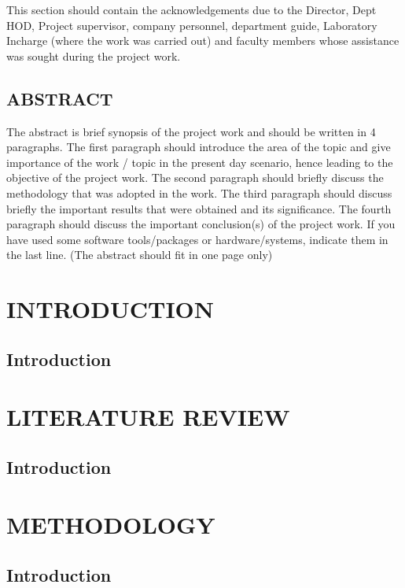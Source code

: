 \documentclass[a4paper,12pt]{report}
\begin{document}
This section should contain the acknowledgements due to the Director, Dept HOD, Project supervisor, company personnel, department guide, Laboratory Incharge (where the work was carried out) and faculty members whose assistance was sought during the project work.
\clearpage
\newpage
\begin{center} \section*{\textbf{\Large ABSTRACT}} \end{center}
The abstract is brief synopsis of the project work and should be written in 4 paragraphs. The
first paragraph should introduce the area of the topic and give importance of the work / topic
in the present day scenario, hence leading to the objective of the project work. The second
paragraph should briefly discuss the methodology that was adopted in the work. The third
paragraph should discuss briefly the important results that were obtained and its significance.
The fourth paragraph should discuss the important conclusion(s) of the project work. If you
have used some software tools/packages or hardware/systems, indicate them in the last line.
(The abstract should fit in one page only)
\newpage
\tableofcontents
\thispagestyle{empty}
\newpage
\listoffigures
{}
\thispagestyle{empty}
\newpage
\listoftables
{}
\thispagestyle{empty}
\newpage
{}
\chapter{\textbf{\Large INTRODUCTION}}
\section{\textbf{ Introduction }}
\newpage
\chapter{\textbf{\Large LITERATURE REVIEW}}
\section{\textbf{ Introduction }}
\newpage
\chapter{\textbf{\Large METHODOLOGY}}
\section{\textbf{ Introduction }}
\newpage
\end{document}
